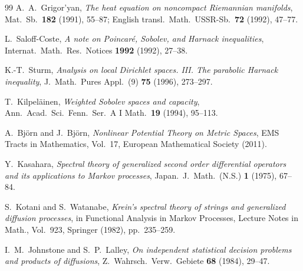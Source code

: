 \documentclass[a4paper,11pt,noarxiv]{quantumarticle}
\theoremstyle{plain}
\theoremstyle{definition}
\theoremstyle{remark}
\begin{document}
\begin{thebibliography}{99}
A.~A.~Grigor'yan, \emph{The heat equation on noncompact Riemannian
manifolds}, Mat.\ Sb.\ \textbf{182} (1991), 55--87; English transl.\
Math.\ USSR-Sb.\ \textbf{72} (1992), 47--77.

L.~Saloff-Coste, \emph{A note on Poincar\'e, Sobolev, and Harnack
inequalities}, Internat.\ Math.\ Res.\ Notices \textbf{1992} (1992),
27--38.

K.-T.~Sturm, \emph{Analysis on local Dirichlet spaces. III. The
parabolic Harnack inequality}, J.\ Math.\ Pures Appl.\ (9) \textbf{75}
(1996), 273--297.

T.~Kilpel\"ainen, \emph{Weighted Sobolev spaces and capacity}, Ann.\
Acad.\ Sci.\ Fenn.\ Ser.\ A I Math.\ \textbf{19} (1994), 95--113.

\bibitem{bjorn2011}
A.~Bj\"orn and J.~Bj\"orn, \emph{Nonlinear Potential Theory on Metric
Spaces}, EMS Tracts in Mathematics, Vol.~17, European Mathematical
Society (2011).

Y.~Kasahara, \emph{Spectral theory of generalized second order
differential operators and its applications to Markov processes},
Japan.\ J.\ Math.\ (N.S.) \textbf{1} (1975), 67--84.

S.~Kotani and S.~Watanabe, \emph{Krein's spectral theory of strings and
generalized diffusion processes}, in Functional Analysis in Markov
Processes, Lecture Notes in Math., Vol.~923, Springer (1982),
pp.~235--259.

I.~M.~Johnstone and S.~P.~Lalley, \emph{On independent statistical
decision problems and products of diffusions}, Z.\ Wahrsch.\ Verw.\
Gebiete \textbf{68} (1984), 29--47.

\end{thebibliography}
\end{document}
